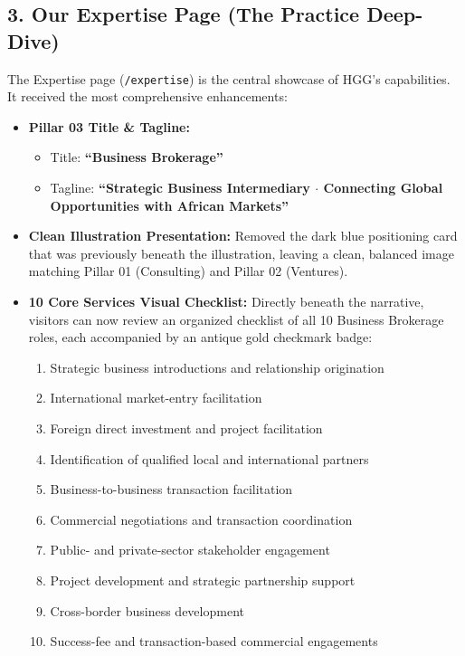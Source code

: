 \documentclass[11pt,a4paper]{article}
\begin{document}
\subsection{3. Our Expertise Page (The Practice Deep-Dive)}
The Expertise page (\texttt{/expertise}) is the central showcase of HGG's capabilities. It received the most comprehensive enhancements:
\begin{itemize}[leftmargin=*]
    \item \textbf{Pillar 03 Title \& Tagline:}
    \begin{itemize}
        \item Title: \textbf{``Business Brokerage''}
        \item Tagline: \textbf{``Strategic Business Intermediary $\cdot$ Connecting Global Opportunities with African Markets''}
    \end{itemize}
    \item \textbf{Clean Illustration Presentation:} Removed the dark blue positioning card that was previously beneath the illustration, leaving a clean, balanced image matching Pillar 01 (Consulting) and Pillar 02 (Ventures).
    \item \textbf{10 Core Services Visual Checklist:} Directly beneath the narrative, visitors can now review an organized checklist of all 10 Business Brokerage roles, each accompanied by an antique gold checkmark badge:
    \begin{enumerate}[noitemsep,topsep=2pt]
        \item Strategic business introductions and relationship origination
        \item International market-entry facilitation
        \item Foreign direct investment and project facilitation
        \item Identification of qualified local and international partners
        \item Business-to-business transaction facilitation
        \item Commercial negotiations and transaction coordination
        \item Public- and private-sector stakeholder engagement
        \item Project development and strategic partnership support
        \item Cross-border business development
        \item Success-fee and transaction-based commercial engagements
    \end{enumerate}

\end{itemize}
\end{document}
